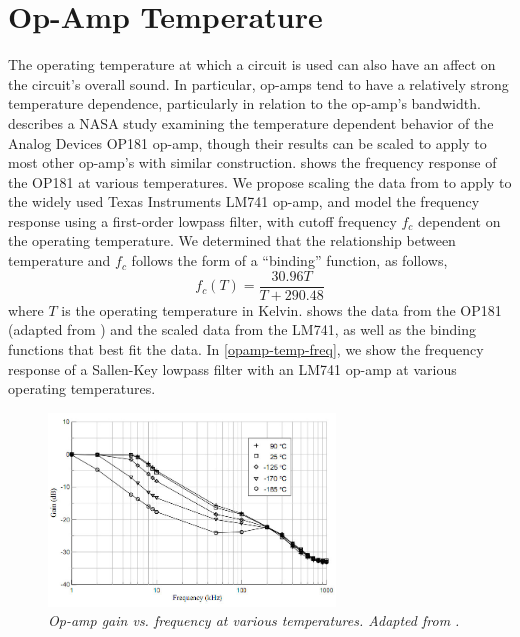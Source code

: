 \documentclass[twoside,a4paper]{article}
\begin{document}
\section{Op-Amp Temperature} \label{sec:temp}
%
The operating temperature at which a circuit is used can also have an
affect on the circuit's overall sound. In particular, op-amps tend to
have a relatively strong temperature dependence, particularly in relation
to the op-amp's bandwidth. \cite{opamp-temp} describes a NASA study
examining the temperature dependent behavior of the Analog Devices OP181
op-amp, though their results can be scaled to apply to most other op-amp's
with similar construction.  shows the frequency response of the
OP181 at various temperatures.
\newline\newline
We propose scaling the data from \cite{opamp-temp} to apply to the widely
used Texas Instruments LM741 op-amp, and model the frequency response
using a first-order lowpass filter, with cutoff frequency $f_c$ dependent
on the operating temperature. We determined that the relationship between
temperature and $f_c$ follows the form of a ``binding'' function, as follows,
%
\begin{equation}
    f_c(T) = \frac{30.96 T}{T + 290.48}  
    \label{eq:binding}
\end{equation}
%
where $T$ is the operating temperature in Kelvin.  shows
the data from the OP181 (adapted from \cite{opamp-temp}) and the scaled
data from the LM741, as well as the binding functions that best fit the
data. In \cref{opamp-temp-freq}, we show the frequency response of a
Sallen-Key lowpass filter with an LM741 op-amp at various operating
temperatures.
%
\begin{figure}[h]
    \center
    \includegraphics[width=3in]{Pics/NASA.png}
    \caption{\label{NASA}{\it Op-amp gain vs. frequency at various
        temperatures. Adapted from \cite{opamp-temp}.}}
\end{figure}
%
\end{document}
